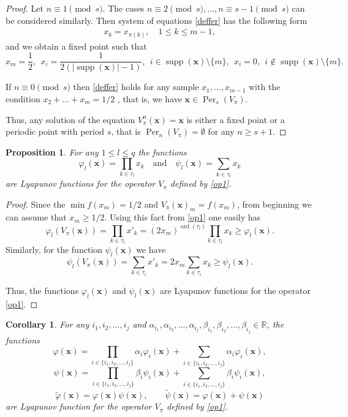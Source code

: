 \documentclass[11pt,reqno]{amsart}
\newtheorem{proposition}[subsection]{Proposition}
\newtheorem{corollary}[subsection]{Corollary}
\numberwithin{equation}{section} \setcounter{tocdepth}{1}
\DeclareMathOperator{\supp}{supp}
\DeclareMathOperator{\ord}{ord}
\DeclareMathOperator{\Per}{Per}
\begin{document}
\begin{proof}
Let $n\equiv 1 \pmod {s}$. The cases $n\equiv 2\pmod {s}, \dots, n\equiv s-1 \pmod {s} $ can be considered  similarly.
Then system of equations \eqref{deffer} has the following form
\begin{align*}
x_{k} =  x_{\pi(k)},  \quad 1\leq k \leq m-1,
\end{align*}
and we obtain a fixed point such that
\[x_m=\frac{1}{2}, \ \ x_i=\frac{1}{ 2(|\supp (\mathbf{x})|-1)}, \ \ i\in \supp (\mathbf{x})\setminus \{m\}, \ \
x_i=0, \ \  i\notin \supp (\mathbf{x})\setminus \{m\}.\]

\vskip 3mm

If $n\equiv 0 \pmod {s}$  then \eqref{deffer} holds for any  sample $x_{1},\dots, x_{m-1}$ with
the condition  $x_2+\dots+x_m=1/2$ , that is, we have $\mathbf{x}\in \Per_s(V_\pi)$.

Thus, any solution of the equation $V_\pi^n(\mathbf{x})=\mathbf{x}$
is either a fixed point or  a periodic point with period $s$, that is
$\Per_n(V_\pi)=\emptyset$ for any $n\geq s+1$.
\end{proof}


\begin{proposition}\label{lyap}
For any $1\leq l\leq q$ the functions
\[\varphi_l (\mathbf{x})= \prod_{k\in \tau_l} x_{k} \quad \text{and} \quad \psi_l (\mathbf{x})= \sum_{k\in \tau_l} x_{k} \]
are Lyapunov functions for the operator $V_\pi$ defined by \eqref{op1}.
\end{proposition}

\begin{proof} Since the $\min f(x_m)= 1/2$  and  $V_\pi(\mathbf{x})_m= f(x_m)$, from beginning we can assume that $x_m\geq 1/2$.
Using this fact from  \eqref{op1} one easily has
\[\varphi_l (V_\pi(\mathbf{x}))=\prod_{k\in \tau_l} x'_{k} = (2x_m)^{\ord(\tau_l)} \prod_{k\in \tau_l} x_{k}\geq \varphi_l (\mathbf{x}).\]
Similarly, for the function $\psi_l (\mathbf{x})$ we have
\[\psi_l (V_\pi(\mathbf{x}))=\sum_{k\in \tau_l} x'_{k}=2x_m \sum_{k\in \tau_l} x_{k}\geq \psi_l (\mathbf{x}).\]

Thus, the functions
$\varphi_l (\mathbf{x})$ and  $\psi_l (\mathbf{x})$ are Lyapunov functions for the operator \eqref{op1}.

\end{proof}

\begin{corollary} For any $i_1,i_2,\dots, i_j$ and $\alpha_{i_1},\alpha_{i_2},\dots,\alpha_{i_j},\beta_{i_1},\beta_{i_2},\dots,\beta_{i_j}\in \mathbb{R}$, the functions
\[\varphi(\mathbf{x}) =\prod_{i\in \{i_1,i_2,\dots, i_j\} } \alpha_{i}\varphi_{i} (\mathbf{x})+ \sum_{i\in \{i_1,i_2,\dots, i_j\} } \alpha_{i}\varphi_{i} (\mathbf{x}), \]
  \[\psi(\mathbf{x}) = \prod_{i\in \{i_1,i_2,\dots, i_j\} } \beta_{i}\psi_{i} (\mathbf{x})+ \sum_{i\in \{i_1,i_2,\dots, i_j\} } \beta_{i}\psi_{i} (\mathbf{x}), \]
\[\widetilde{\varphi}(\mathbf{x})= \varphi(\mathbf{x})\psi(\mathbf{x}), \qquad   \widetilde{\psi}(\mathbf{x})=\varphi(\mathbf{x})+\psi(\mathbf{x})  \]
are  Lyapunov function for the operator $V_\pi$ defined by \eqref{op1}.
\end{corollary}
\end{document}
